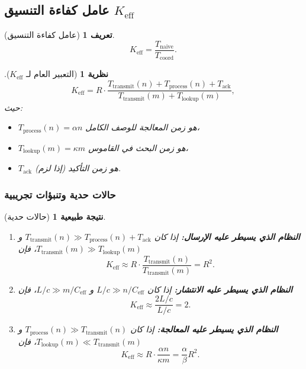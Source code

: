\documentclass[11pt,a4paper]{article}
\newtheorem{theorem}{نظرية}
\newtheorem{definition}{تعريف}
\newtheorem{corollary}{نتيجة طبيعية}
\begin{document}
	\subsection{عامل كفاءة التنسيق $K_{\mathrm{eff}}$}
	
	\begin{definition}[عامل كفاءة التنسيق]
		\[
		K_{\mathrm{eff}} = \frac{T_{\text{naive}}}{T_{\text{coord}}}.
		\]
	\end{definition}
	
	\begin{theorem}[التعبير العام لـ $K_{\mathrm{eff}}$]
		\label{thm:keff-expression}
		\[
		K_{\mathrm{eff}} = R \cdot \frac{T_{\text{transmit}}(n) + T_{\text{process}}(n) + T_{\text{ack}}}{T_{\text{transmit}}(m) + T_{\text{lookup}}(m)},
		\]
		حيث:
		\begin{itemize}
			\item $T_{\text{process}}(n) = \alpha n$ هو زمن المعالجة للوصف الكامل،
			\item $T_{\text{lookup}}(m) = \kappa m$ هو زمن البحث في القاموس،
			\item $T_{\text{ack}}$ هو زمن التأكيد (إذا لزم).
		\end{itemize}
	\end{theorem}
	
	\subsubsection{حالات حدية وتنبؤات تجريبية}
	
	\begin{corollary}[حالات حدية]
		\begin{enumerate}
			\item \textbf{النظام الذي يسيطر عليه الإرسال:} إذا كان $T_{\text{transmit}}(n) \gg T_{\text{process}}(n) + T_{\text{ack}}$ و $T_{\text{transmit}}(m) \gg T_{\text{lookup}}(m)$، فإن
			\[
			K_{\mathrm{eff}} \approx R \cdot \frac{T_{\text{transmit}}(n)}{T_{\text{transmit}}(m)} = R^2.
			\]
			
			\item \textbf{النظام الذي يسيطر عليه الانتشار:} إذا كان $L/c \gg n/C_{\text{eff}}$ و $L/c \gg m/C_{\text{eff}}$، فإن
			\[
			K_{\mathrm{eff}} \approx \frac{2L/c}{L/c} = 2.
			\]
			
			\item \textbf{النظام الذي يسيطر عليه المعالجة:} إذا كان $T_{\text{process}}(n) \gg T_{\text{transmit}}(n)$ و $T_{\text{lookup}}(m) \ll T_{\text{transmit}}(m)$، فإن
			\[
			K_{\mathrm{eff}} \approx R \cdot \frac{\alpha n}{\kappa m} = \frac{\alpha}{\beta} R^2.
			\]
		\end{enumerate}
	\end{corollary}
	
\end{document}
